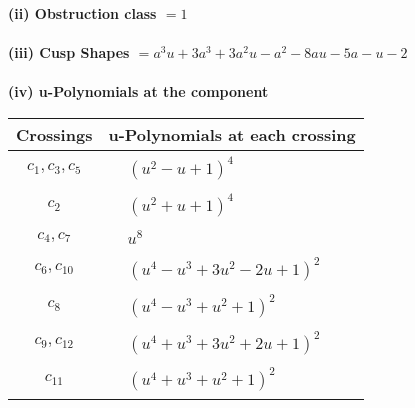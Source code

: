 \documentclass[1p]{elsarticle_modified}
\theoremstyle{definition}
\begin{document}
\flushleft \textbf{(ii) Obstruction class $= 1$}\\~\\
\flushleft \textbf{(iii) Cusp Shapes $= a^3 u+3 a^3+3 a^2 u- a^2-8 a u-5 a- u-2$}\\~\\
\newpage\renewcommand{\arraystretch}{1}
\flushleft \textbf{(iv) u-Polynomials at the component}\newline \\
\begin{tabular}{m{50pt}|m{274pt}}
Crossings & \hspace{64pt}u-Polynomials at each crossing \\
\hline $$\begin{aligned}c_{1},c_{3},c_{5}\end{aligned}$$&$\begin{aligned}
&(u^2- u+1)^4
\end{aligned}$\\
\hline $$\begin{aligned}c_{2}\end{aligned}$$&$\begin{aligned}
&(u^2+u+1)^4
\end{aligned}$\\
\hline $$\begin{aligned}c_{4},c_{7}\end{aligned}$$&$\begin{aligned}
&u^8
\end{aligned}$\\
\hline $$\begin{aligned}c_{6},c_{10}\end{aligned}$$&$\begin{aligned}
&(u^4- u^3+3 u^2-2 u+1)^2
\end{aligned}$\\
\hline $$\begin{aligned}c_{8}\end{aligned}$$&$\begin{aligned}
&(u^4- u^3+u^2+1)^2
\end{aligned}$\\
\hline $$\begin{aligned}c_{9},c_{12}\end{aligned}$$&$\begin{aligned}
&(u^4+u^3+3 u^2+2 u+1)^2
\end{aligned}$\\
\hline $$\begin{aligned}c_{11}\end{aligned}$$&$\begin{aligned}
&(u^4+u^3+u^2+1)^2
\end{aligned}$\\
\hline
\end{tabular}\\~\\
\end{document}
